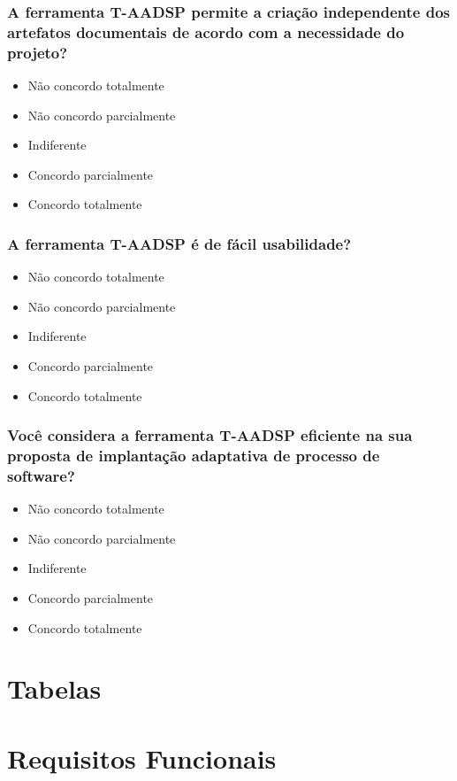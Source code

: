 \documentclass{acm_proc_article-sp}
\begin{document}
\begin{appendices}
\subsection{A ferramenta T-AADSP permite a criação independente dos artefatos documentais de acordo com a necessidade do projeto?}
\begin{itemize}
\item Não concordo totalmente
\item Não concordo parcialmente
\item Indiferente
\item Concordo parcialmente
\item Concordo totalmente
\end{itemize}

\subsection{A ferramenta T-AADSP é de fácil usabilidade?}
\begin{itemize}
\item Não concordo totalmente
\item Não concordo parcialmente
\item Indiferente
\item Concordo parcialmente
\item Concordo totalmente
\end{itemize}

\subsection{Você considera a ferramenta T-AADSP eficiente na sua proposta de implantação adaptativa de processo de software?}
\begin{itemize}
\item Não concordo totalmente
\item Não concordo parcialmente
\item Indiferente
\item Concordo parcialmente
\item Concordo totalmente
\end{itemize}

\chapter{Tabelas}

\chapter{Requisitos Funcionais}


\end{appendices}
\end{document}
